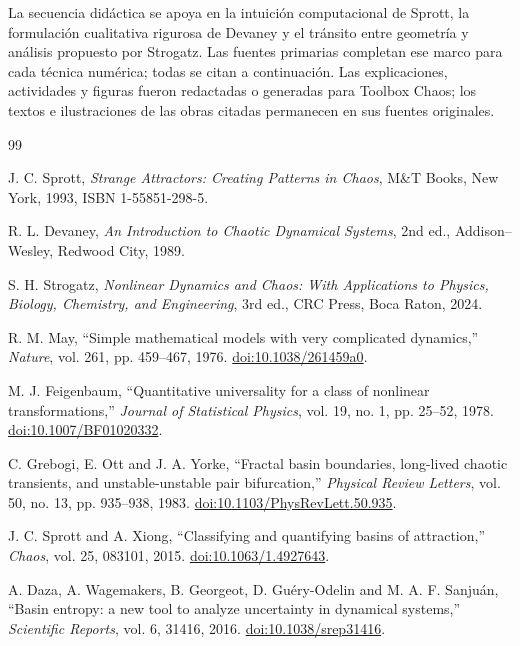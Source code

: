 \documentclass[11pt,a4paper]{article}
\begin{document}
La secuencia didáctica se apoya en la intuición computacional de Sprott, la
formulación cualitativa rigurosa de Devaney y el tránsito entre geometría y análisis
propuesto por Strogatz. Las fuentes primarias completan ese marco para cada técnica
numérica; todas se citan a continuación. Las explicaciones, actividades y figuras
fueron redactadas o generadas para Toolbox Chaos; los textos e ilustraciones de las
obras citadas permanecen en sus fuentes originales.

\begin{thebibliography}{99}

J. C. Sprott, \emph{Strange Attractors: Creating Patterns in Chaos}, M\&T Books,
New York, 1993, ISBN 1-55851-298-5.

R. L. Devaney, \emph{An Introduction to Chaotic Dynamical Systems}, 2nd ed.,
Addison--Wesley, Redwood City, 1989.

S. H. Strogatz, \emph{Nonlinear Dynamics and Chaos: With Applications to Physics,
Biology, Chemistry, and Engineering}, 3rd ed., CRC Press, Boca Raton, 2024.

R. M. May, ``Simple mathematical models with very complicated dynamics,''
\emph{Nature}, vol. 261, pp. 459--467, 1976.
\href{https://doi.org/10.1038/261459a0}{doi:10.1038/261459a0}.

M. J. Feigenbaum, ``Quantitative universality for a class of nonlinear
transformations,'' \emph{Journal of Statistical Physics}, vol. 19, no. 1,
pp. 25--52, 1978.
\href{https://doi.org/10.1007/BF01020332}{doi:10.1007/BF01020332}.

C. Grebogi, E. Ott and J. A. Yorke, ``Fractal basin boundaries, long-lived chaotic
transients, and unstable-unstable pair bifurcation,'' \emph{Physical Review Letters},
vol. 50, no. 13, pp. 935--938, 1983.
\href{https://doi.org/10.1103/PhysRevLett.50.935}{doi:10.1103/PhysRevLett.50.935}.

J. C. Sprott and A. Xiong, ``Classifying and quantifying basins of attraction,''
\emph{Chaos}, vol. 25, 083101, 2015.
\href{https://doi.org/10.1063/1.4927643}{doi:10.1063/1.4927643}.

A. Daza, A. Wagemakers, B. Georgeot, D. Guéry-Odelin and M. A. F. Sanjuán,
``Basin entropy: a new tool to analyze uncertainty in dynamical systems,''
\emph{Scientific Reports}, vol. 6, 31416, 2016.
\href{https://doi.org/10.1038/srep31416}{doi:10.1038/srep31416}.


\end{thebibliography}
\end{document}
